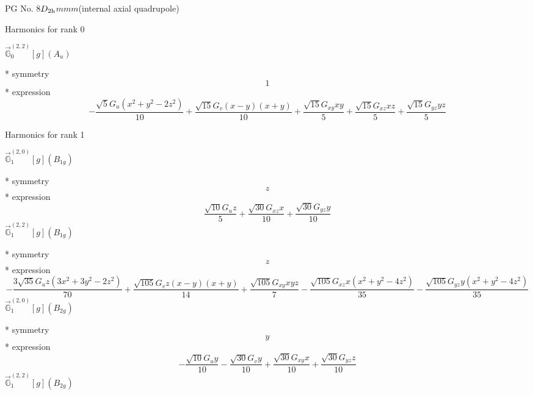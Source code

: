 \documentclass[fleqn,8pt]{jsarticle}
\begin{document}
\setcounter{MaxMatrixCols}{32}

\renewcommand{\tablename}{Table~}
\renewcommand{\figurename}{Figure~}
\begin{center}
\LARGE
PG No. 8\quad$D_{\rm 2h}$\quad$mmm$\quad[ orthorhombic ] (internal axial quadrupole)
\end{center}

\noindent * Harmonics for rank 0

\noindent\quad $\vec{\mathbb{G}}_{0}^{(2,2)}[g](A_{u})$

\noindent\quad ** symmetry
\begin{dmath*}
1
\end{dmath*}
\noindent\quad ** expression
\begin{dmath*}
- \frac{\sqrt{5} G_{u} \left(x^{2} + y^{2} - 2 z^{2}\right)}{10} + \frac{\sqrt{15} G_{v} \left(x - y\right) \left(x + y\right)}{10} + \frac{\sqrt{15} G_{xy} x y}{5} + \frac{\sqrt{15} G_{xz} x z}{5} + \frac{\sqrt{15} G_{yz} y z}{5}
\end{dmath*}

\noindent * Harmonics for rank 1

\noindent\quad $\vec{\mathbb{G}}_{1}^{(2,0)}[g](B_{1g})$

\noindent\quad ** symmetry
\begin{dmath*}
z
\end{dmath*}
\noindent\quad ** expression
\begin{dmath*}
\frac{\sqrt{10} G_{u} z}{5} + \frac{\sqrt{30} G_{xz} x}{10} + \frac{\sqrt{30} G_{yz} y}{10}
\end{dmath*}
\noindent\quad $\vec{\mathbb{G}}_{1}^{(2,2)}[g](B_{1g})$

\noindent\quad ** symmetry
\begin{dmath*}
z
\end{dmath*}
\noindent\quad ** expression
\begin{dmath*}
- \frac{3 \sqrt{35} G_{u} z \left(3 x^{2} + 3 y^{2} - 2 z^{2}\right)}{70} + \frac{\sqrt{105} G_{v} z \left(x - y\right) \left(x + y\right)}{14} + \frac{\sqrt{105} G_{xy} x y z}{7} - \frac{\sqrt{105} G_{xz} x \left(x^{2} + y^{2} - 4 z^{2}\right)}{35} - \frac{\sqrt{105} G_{yz} y \left(x^{2} + y^{2} - 4 z^{2}\right)}{35}
\end{dmath*}
\noindent\quad $\vec{\mathbb{G}}_{1}^{(2,0)}[g](B_{2g})$

\noindent\quad ** symmetry
\begin{dmath*}
y
\end{dmath*}
\noindent\quad ** expression
\begin{dmath*}
- \frac{\sqrt{10} G_{u} y}{10} - \frac{\sqrt{30} G_{v} y}{10} + \frac{\sqrt{30} G_{xy} x}{10} + \frac{\sqrt{30} G_{yz} z}{10}
\end{dmath*}
\noindent\quad $\vec{\mathbb{G}}_{1}^{(2,2)}[g](B_{2g})$
\end{document}
